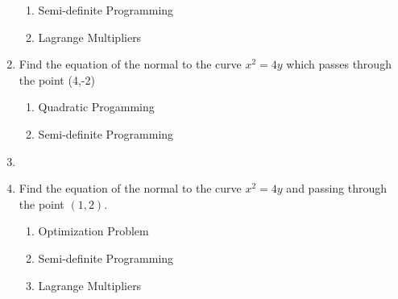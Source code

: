 \begin{enumerate}[label=\thechapter.\arabic*,ref=\thechapter.\theenumi]
\begin{enumerate}
 
\item Semi-definite Programming
	\\
\label{12/6/5/27/conv/sdp}

\item  Lagrange Multipliers
\label{12/6/5/27/conv/lagmul}

		\end{enumerate}
\item  Find the equation of the normal to the curve $x^2=4y$ which passes through the point (4,-2)
		\\
		\solution
		\begin{enumerate}
			\item Quadratic Progamming

\item Semi-definite Programming

		\end{enumerate}


\item
\label{12/6/6/22}


	\item Find the equation of the normal to the curve $x^2=4y$ and passing through the point $(1,2)$.
    \\
\solution 
		\begin{enumerate}
	\item Optimization Problem
		\\

\item Semi-definite Programming
\label{12/6/6/23}

\item  Lagrange Multipliers
	\\
\label{12/6/6/23/lagmul}

		\end{enumerate}



\end{enumerate}
